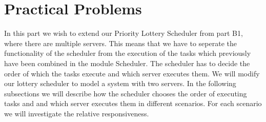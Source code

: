 \documentclass[12pt]{report}
\begin{document}
\section*{Practical Problems}
In this part we wish to extend our Priority Lottery Scheduler from part B1, where there are multiple servers. This means that we have to seperate the functionality of the scheduler from the execution of the tasks which previously have been combined in the module Scheduler. The scheduler has to decide the order of which the tasks execute and which server executes them. We will modify our lottery scheduler to model a system with two servers. In the following subsections we will describe how the scheduler chooses the order of executing tasks and and which server executes them in different scenarios. For each scenario we will investigate the relative responsiveness.
\end{document}

